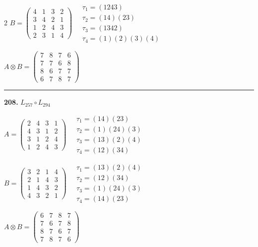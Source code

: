 \begin{multicols}{2}
$B = \begin{pmatrix} 4 & 1 & 3 & 2 \\ 3 & 4 & 2 & 1 \\ 1 & 2 & 4 & 3 \\ 2 & 3 & 1 & 4 \end{pmatrix} \quad \begin{matrix} \tau_{1}=(1 2 4 3) \\ \tau_{2}=(1 4)(2 3) \\ \tau_{3}=(1 3 4 2) \\ \tau_{4}=(1)(2)(3)(4) \end{matrix}$

$A \otimes B = \begin{pmatrix} 7 & 8 & 7 & 6 \\ 7 & 7 & 6 & 8 \\ 8 & 6 & 7 & 7 \\ 6 & 7 & 8 & 7 \end{pmatrix}$

\vspace{0.3em}
\hrule
\vspace{0.3em}

\noindent\textbf{208.} $L_{257} \circ L_{294}$

$A = \begin{pmatrix} 2 & 4 & 3 & 1 \\ 4 & 3 & 1 & 2 \\ 3 & 1 & 2 & 4 \\ 1 & 2 & 4 & 3 \end{pmatrix} \quad \begin{matrix} \tau_{1}=(1 4)(2 3) \\ \tau_{2}=(1)(2 4)(3) \\ \tau_{3}=(1 3)(2)(4) \\ \tau_{4}=(1 2)(3 4) \end{matrix}$

$B = \begin{pmatrix} 3 & 2 & 1 & 4 \\ 2 & 1 & 4 & 3 \\ 1 & 4 & 3 & 2 \\ 4 & 3 & 2 & 1 \end{pmatrix} \quad \begin{matrix} \tau_{1}=(1 3)(2)(4) \\ \tau_{2}=(1 2)(3 4) \\ \tau_{3}=(1)(2 4)(3) \\ \tau_{4}=(1 4)(2 3) \end{matrix}$

$A \otimes B = \begin{pmatrix} 6 & 7 & 8 & 7 \\ 7 & 6 & 7 & 8 \\ 8 & 7 & 6 & 7 \\ 7 & 8 & 7 & 6 \end{pmatrix}$


\end{multicols}
